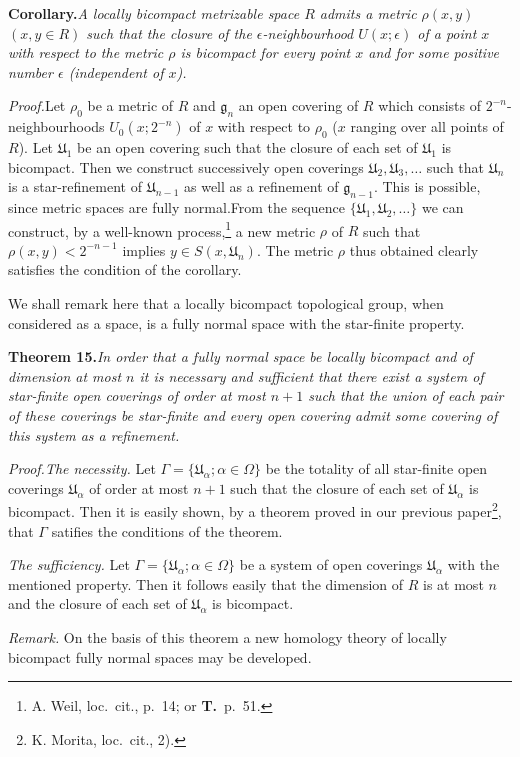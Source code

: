 \documentclass[11pt,a4paper,leqno]{article}
\newcommand{\g}{\mathfrak g}
\newcommand{\thm}[2]{\par\medskip\textbf{Theorem #1.}\quad\textit{#2}\par}
\newcommand{\proof}{\textit{Proof.}\quad}
\begin{document}
\textbf{Corollary.}\quad\textit{A locally bicompact metrizable space $R$ admits a metric $\rho(x,y)$ $(x,y\in R)$ such that the closure of the $\epsilon$-neighbourhood $U(x;\epsilon)$ of a point $x$ with respect to the metric $\rho$ is bicompact for every point $x$ and for some positive number $\epsilon$ (independent of $x$).}

\proof Let $\rho_0$ be a metric of $R$ and $\g_n$ an open covering of $R$ which consists of $2^{-n}$-neighbourhoods $U_0(x;2^{-n})$ of $x$ with respect to $\rho_0$ ($x$ ranging over all points of $R$). Let $\mathfrak U_1$ be an open covering such that the closure of each set of $\mathfrak U_1$ is bicompact. Then we construct successively open coverings $\mathfrak U_2,\mathfrak U_3,\ldots$ such that $\mathfrak U_n$ is a star-refinement of $\mathfrak U_{n-1}$ as well as a refinement of $\g_{n-1}$. This is possible, since metric spaces are fully normal.\footnotemark[6] From the sequence $\{\mathfrak U_1,\mathfrak U_2,\ldots\}$ we can construct, by a well-known process,\footnote{A. Weil, loc.\ cit., p.\ 14; or \textbf{T.}\ p.\ 51.} a new metric $\rho$ of $R$ such that $\rho(x,y)<2^{-n-1}$ implies $y\in S(x,\mathfrak U_n)$. The metric $\rho$ thus obtained clearly satisfies the condition of the corollary.

We shall remark here that a locally bicompact topological group, when considered as a space, is a fully normal space with the star-finite property.

\thm{15}{In order that a fully normal space be locally bicompact and of dimension at most $n$ it is necessary and sufficient that there exist a system of star-finite open coverings of order at most $n+1$ such that the union of each pair of these coverings be star-finite and every open covering admit some covering of this system as a refinement.}

\proof \textit{The necessity.} Let $\Gamma=\{\mathfrak U_\alpha;\alpha\in\Omega\}$ be the totality of all star-finite open coverings $\mathfrak U_\alpha$ of order at most $n+1$ such that the closure of each set of $\mathfrak U_\alpha$ is bicompact. Then it is easily shown, by a theorem proved in our previous paper\footnote{K. Morita, loc.\ cit., 2).}, that $\Gamma$ satifies the conditions of the theorem.

\textit{The sufficiency.} Let $\Gamma=\{\mathfrak U_\alpha;\alpha\in\Omega\}$ be a system of open coverings $\mathfrak U_\alpha$ with the mentioned property. Then it follows easily that the dimension of $R$ is at most $n$ and the closure of each set of $\mathfrak U_\alpha$ is bicompact.

\textit{Remark.} On the basis of this theorem a new homology theory of locally bicompact fully normal spaces may be developed.
\end{document}
